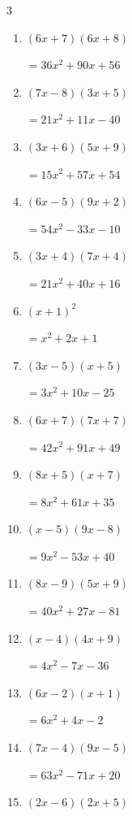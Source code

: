 \begin{multicols}{3}
\begin{enumerate}
        $=54x^{2}-84x+16$

\columnbreak %

  \item $(6x+7)(6x+8)$

        $=36x^{2}+90x+56$

  \item $(7x-8)(3x+5)$

        $=21x^{2}+11x-40$

  \item $(3x+6)(5x+9)$

        $=15x^{2}+57x+54$

  \item $(6x-5)(9x+2)$

        $=54x^{2}-33x-10$

  \item $(3x+4)(7x+4)$

        $=21x^{2}+40x+16$

  \item $(x+1)^{2}$

        $=x^{2}+2x+1$

  \item $(3x-5)(x+5)$

        $=3x^{2}+10x-25$

  \item $(6x+7)(7x+7)$

        $=42x^{2}+91x+49$

  \item $(8x+5)(x+7)$

        $=8x^{2}+61x+35$

  \item $(x-5)(9x-8)$

        $=9x^{2}-53x+40$

  \item $(8x-9)(5x+9)$

        $=40x^{2}+27x-81$

  \item $(x-4)(4x+9)$

        $=4x^{2}-7x-36$

  \item $(6x-2)(x+1)$

        $=6x^{2}+4x-2$

  \item $(7x-4)(9x-5)$

        $=63x^{2}-71x+20$

  \item $(2x-6)(2x+5)$


\end{enumerate}
\end{multicols}
